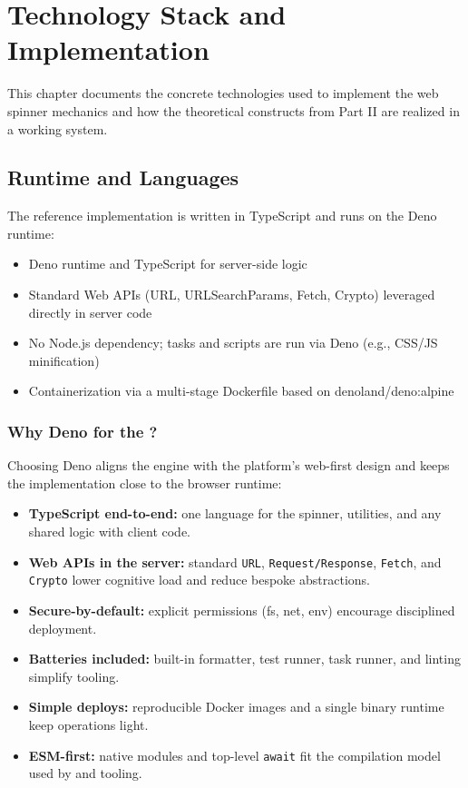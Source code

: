\chapter{Technology Stack and Implementation}
\label{chap:technology}

This chapter documents the concrete technologies used to implement the web spinner mechanics and how the theoretical constructs from Part II are realized in a working system.

\section{Runtime and Languages}
The reference implementation is written in TypeScript and runs on the Deno runtime:
\begin{itemize}
	\item Deno runtime and TypeScript for server-side logic
	\item Standard Web APIs (URL, URLSearchParams, Fetch, Crypto) leveraged directly in server code
	\item No Node.js dependency; tasks and scripts are run via Deno (e.g., CSS/JS minification)
	\item Containerization via a multi-stage Dockerfile based on denoland/deno:alpine
\end{itemize}

\subsection{Why Deno for the \webspinner?}
Choosing Deno aligns the engine with the platform’s web-first design and keeps the implementation close to the browser runtime:
\begin{itemize}
	\item \textbf{TypeScript end-to-end:} one language for the spinner, utilities, and any shared logic with client code.
	\item \textbf{Web APIs in the server:} standard \texttt{URL}, \texttt{Request/Response}, \texttt{Fetch}, and \texttt{Crypto} lower cognitive load and reduce bespoke abstractions.
	\item \textbf{Secure-by-default:} explicit permissions (fs, net, env) encourage disciplined deployment.
	\item \textbf{Batteries included:} built-in formatter, test runner, task runner, and linting simplify tooling.
	\item \textbf{Simple deploys:} reproducible Docker images and a single binary runtime keep operations light.
	\item \textbf{ESM-first:} native modules and top-level \texttt{await} fit the compilation model used by \wbll and \wbpl tooling.
\end{itemize}

